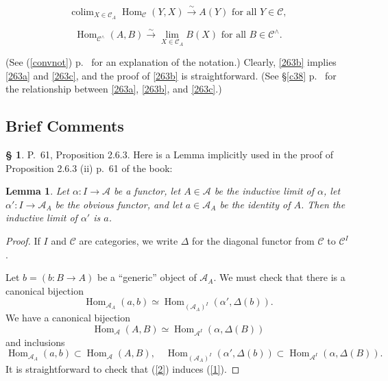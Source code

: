 \documentclass[12pt]{article}
\newtheorem{lem}[thm]{Lemma}
\theoremstyle{remark}
\theoremstyle{definition}
\newtheorem{s}[thm]{\S}
\newcommand{\A}{\mathcal A}
\newcommand{\C}{\mathcal C}
\newcommand{\cn}{(See (\ref{convnot}) p.~\pageref{convnot} for an explanation of the notation.) }%
\DeclareMathOperator*{\co}{colim}
\DeclareMathOperator{\Hom}{Hom}%
\begin{document}
\begin{equation}\label{263b}
\co_{X\in\C_A}\Hom_\C(Y,X)\xrightarrow\sim A(Y)\text{ for all }Y\in\C, 
\end{equation}

\begin{equation}\label{263c}
\Hom_{\C^\wedge}(A,B)\xrightarrow\sim\lim_{X\in\C_A}B(X)\text{ for all }B\in\C^\wedge. 
\end{equation}

\noindent\cn Clearly, \eqref{263b} implies \eqref{263a} and \eqref{263c}, and the proof of \eqref{263b} is straightforward. (See \S\ref{c38} p.~\pageref{c38} for the relationship between \eqref{263a}, \eqref{263b}, and \eqref{263c}.)
%
%
\subsection{Brief Comments}
%
\begin{s} 
P.~61, Proposition 2.6.3. Here is a Lemma implicitly used in the proof of Proposition 2.6.3 (ii) p.~61 of the book: 
%
\begin{lem} 
Let $\alpha:I\to\A$ be a functor, let $A\in\A$ be the inductive limit of $\alpha$, let $\alpha':I\to\A_A$ be the obvious functor, and let $a\in\A_A$ be the identity of $A$. Then the inductive limit of $\alpha'$ is $a$. 
\end{lem} 
%
\begin{proof}
If $I$ and $\C$ are categories, we write $\Delta$ for the diagonal functor from $\C$ to $\C^I$. 

Let $b=(b:B\to A)$ be a ``generic'' object of $\A_A$. We must check that there is a canonical bijection
%
\begin{equation}\label{1}
\Hom_{\A_A}(a,b)\simeq\Hom_{(\A_A)^I}(\alpha',\Delta(b)).
\end{equation}
%
We have a canonical bijection
%
\begin{equation}\label{2}
\Hom_\A(A,B)\simeq\Hom_{\A^I}(\alpha,\Delta(B))
\end{equation}
%
and inclusions 
$$
\Hom_{\A_A}(a,b)\subset\Hom_\A(A,B),\quad
%
\Hom_{(\A_A)^I}(\alpha',\Delta(b))\subset\Hom_{\A^I}(\alpha,\Delta(B)).
$$
It is straightforward to check that (\ref{2}) induces (\ref{1}).
\end{proof}
\end{s}
%
%
\end{document}
